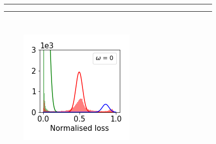 \documentclass[12pt]{article}
\begin{document}
\begin{figure}[t]
    \centering
      \\
    \noindent  \rule{5cm}{0.5pt} \hspace{12mm} \rule{5cm}{0.5pt}
    \\
    
    \begin{subfigure}{.18\textwidth}
      \centering
      \includegraphics[width=\linewidth]{images/loss_dist/EDM_0.6_1.00_cifar100.png} 
    \end{subfigure}
    \begin{subfigure}{.18\textwidth}
      \centering

\end{subfigure}
\end{figure}
\end{document}
